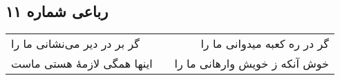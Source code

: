 \begin{center}
\section*{رباعی شماره ۱۱}
\label{sec:sh011}
\begin{longtable}{l p{0.5cm} r}
گر بر در دیر می‌نشانی ما را
&&
گر در ره کعبه میدوانی ما را
\\
اینها همگی لازمهٔ هستی ماست
&&
خوش آنکه ز خویش وارهانی ما را
\\
\end{longtable}
\end{center}
